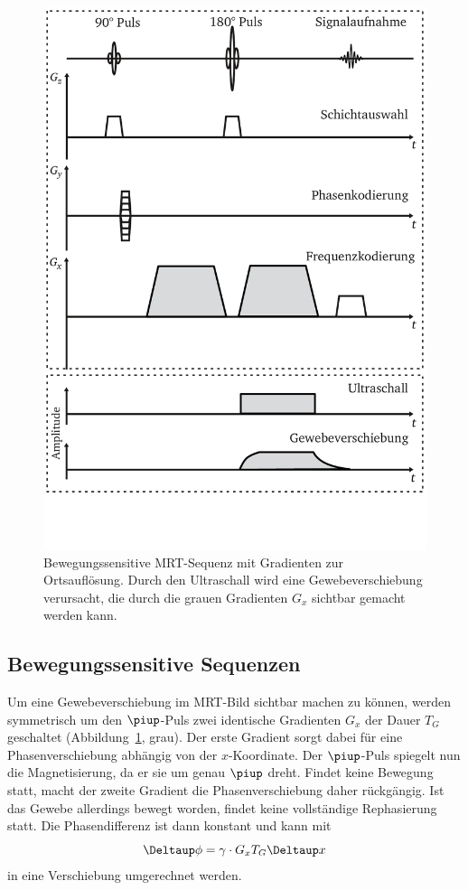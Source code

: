 \documentclass[
    11pt,
    ngerman
]{scrreprt}
\begin{document}
\begin{figure}
    \centering
    \includegraphics[width=.7\textwidth]{Abbildungen/sediffmono.pdf}
    \caption{%
        Bewegungssensitive MRT-Sequenz mit Gradienten zur Ortsauflösung. Durch den Ultraschall wird eine Gewebeverschiebung verursacht, die durch die grauen Gradienten $G_x$ sichtbar gemacht werden kann.
    }
    \label{fig:bew-sens-sequenz}
\end{figure}

\subsection{Bewegungssensitive Sequenzen}

Um eine Gewebeverschiebung im MRT-Bild sichtbar machen zu können, werden symmetrisch um den $\piup$-Puls zwei identische Gradienten $G_x$ der Dauer $T_G$ geschaltet (Abbildung~\ref{fig:bew-sens-sequenz}, grau). Der erste Gradient sorgt dabei für eine Phasenverschiebung abhängig von der $x$-Koordinate. Der $\piup$-Puls spiegelt nun die Magnetisierung, da er sie um genau $\piup$ dreht. Findet keine Bewegung statt, macht der zweite Gradient die Phasenverschiebung daher rückgängig. Ist das Gewebe allerdings bewegt worden, findet keine vollständige Rephasierung statt. Die Phasendifferenz ist dann konstant und kann mit
\begin{equation}
    \Deltaup \phi = \gamma \cdot G_x T_G \Deltaup x \label{eq:phi_x}
\end{equation}
in eine Verschiebung umgerechnet werden.
\end{document}
